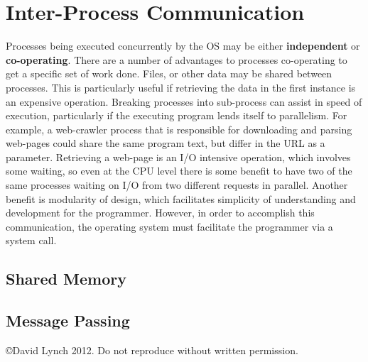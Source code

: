 \documentclass[10pt,a4paper]{article}
\begin{document}
\section{Inter-Process Communication}
Processes being executed concurrently by the OS may be either {\bf independent} or {\bf co-operating}. There are a number of advantages to processes co-operating to get a specific set of work done. Files, or other data may be shared between processes. This is particularly useful if retrieving the data in the first instance is an expensive operation. Breaking processes into sub-process can assist in speed of execution, particularly if the executing program lends itself to parallelism. For example, a web-crawler process that is responsible for downloading and parsing web-pages could share the same program text, but differ in the URL as a parameter. Retrieving a web-page is an I/O intensive operation, which involves some waiting, so even at the CPU level there is some benefit to have two of the same processes waiting on I/O from two different requests in parallel.  Another benefit is modularity of design, which facilitates simplicity of understanding and development for the programmer. However, in order to accomplish this communication, the operating system must facilitate the programmer via a system call. 
\subsection{Shared Memory}
\subsection{Message Passing}

{}

\begin{center}
{\small \copyright  David Lynch 2012. Do not reproduce without written permission.}
\end{center}
\end{document}

